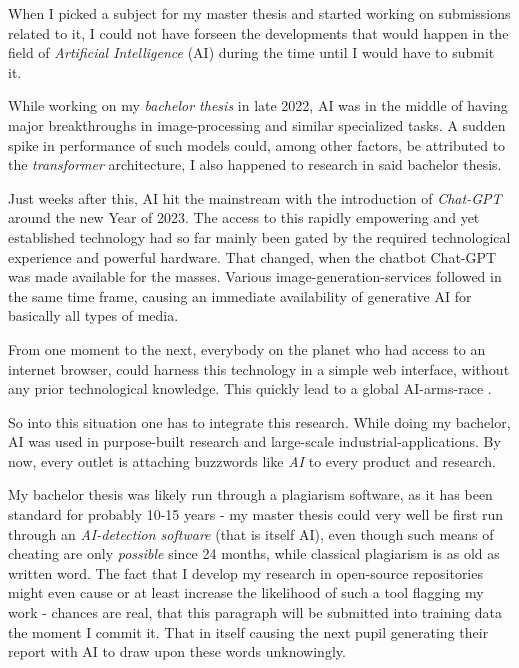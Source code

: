 When I picked a subject for my master thesis and started working on submissions related to it, I could not have forseen the developments that would happen in the field of \emph{Artificial Intelligence} (AI) during the time until I would have to submit it.

While working on my \emph{bachelor thesis} \cite{selfBachelorThesis} in late 2022, AI was in the middle of having major breakthroughs in image-processing and similar specialized tasks. 
A sudden spike in performance of such models could, among other factors, be attributed to the \emph{transformer} architecture, I also happened to research in said bachelor thesis.

Just weeks after this, AI hit the mainstream with the introduction of \emph{Chat-GPT} \cite{chatGPT} around the new Year of 2023.
The access to this rapidly empowering and yet established technology had so far mainly been gated by the required technological experience and powerful hardware. 
That changed, when the chatbot Chat-GPT was made available for the masses. 
Various image-generation-services followed in the same time frame, causing an immediate availability of generative AI for basically all types of media.

From one moment to the next, everybody on the planet who had access to an internet browser, could harness this technology in a simple web interface, without any prior technological knowledge. 
This quickly lead to a global AI-arms-race \cite{aiBoom}.


So into this situation one has to integrate this research. 
While doing my bachelor, AI was used in purpose-built research and large-scale industrial-applications.
By now, every outlet is attaching buzzwords like \emph{AI} to every product and research.

My bachelor thesis was likely run through a plagiarism software, as it has been standard for probably 10-15 years - my master thesis could very well be first run through an \emph{AI-detection software} (that is itself \glqq AI\grqq), even though such means of cheating are only \emph{possible} since 24 months, while classical plagiarism is as old as written word.
The fact that I develop my research in open-source repositories might even cause or at least increase the likelihood of such a tool flagging my work - chances are real, that this paragraph will be submitted into training data the moment I commit it.
That in itself causing the next pupil generating their report with AI to draw upon these words unknowingly.\\

